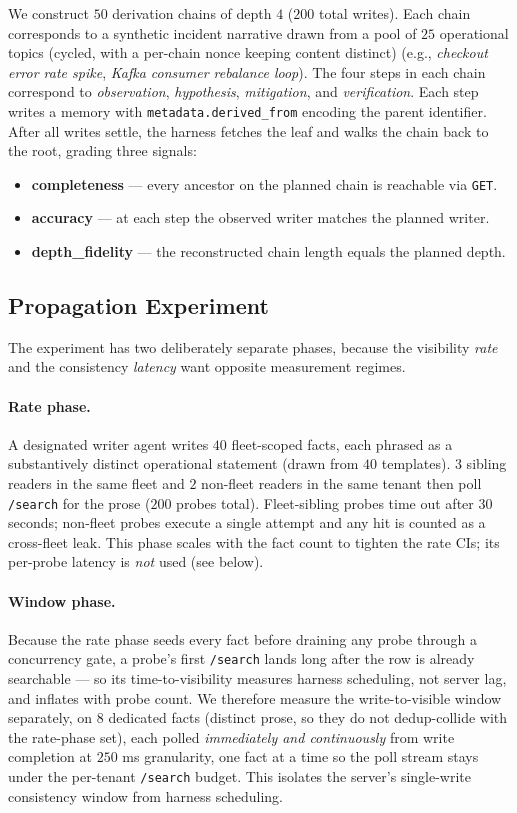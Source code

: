 \documentclass[10pt,twocolumn,letterpaper]{article}
\begin{document}
We construct \(50\) derivation chains of depth \(4\) (\(200\) total writes). Each chain corresponds to a synthetic incident narrative drawn from a pool of \(25\) operational topics (cycled, with a per-chain nonce keeping content distinct) (e.g., \emph{checkout error rate spike}, \emph{Kafka consumer rebalance loop}). The four steps in each chain correspond to \emph{observation}, \emph{hypothesis}, \emph{mitigation}, and \emph{verification}. Each step writes a memory with \texttt{metadata.derived\_from} encoding the parent identifier. After all writes settle, the harness fetches the leaf and walks the chain back to the root, grading three signals:
\begin{itemize}
    \item \textbf{completeness} --- every ancestor on the planned chain is reachable via \texttt{GET}.
    \item \textbf{accuracy} --- at each step the observed writer matches the planned writer.
    \item \textbf{depth\_fidelity} --- the reconstructed chain length equals the planned depth.
\end{itemize}

\subsection{Propagation Experiment}

The experiment has two deliberately separate phases, because the visibility \emph{rate} and the consistency \emph{latency} want opposite measurement regimes.

\paragraph{Rate phase.} A designated writer agent writes \(40\) fleet-scoped facts, each phrased as a substantively distinct operational statement (drawn from \(40\) templates). \(3\) sibling readers in the same fleet and \(2\) non-fleet readers in the same tenant then poll \texttt{/search} for the prose (\(200\) probes total). Fleet-sibling probes time out after \(30\) seconds; non-fleet probes execute a single attempt and any hit is counted as a cross-fleet leak. This phase scales with the fact count to tighten the rate CIs; its per-probe latency is \emph{not} used (see below).

\paragraph{Window phase.} Because the rate phase seeds every fact before draining any probe through a concurrency gate, a probe's first \texttt{/search} lands long after the row is already searchable --- so its time-to-visibility measures harness scheduling, not server lag, and inflates with probe count. We therefore measure the write-to-visible window separately, on \(8\) dedicated facts (distinct prose, so they do not dedup-collide with the rate-phase set), each polled \emph{immediately and continuously} from write completion at \(250\) ms granularity, one fact at a time so the poll stream stays under the per-tenant \texttt{/search} budget. This isolates the server's single-write consistency window from harness scheduling.
\end{document}
